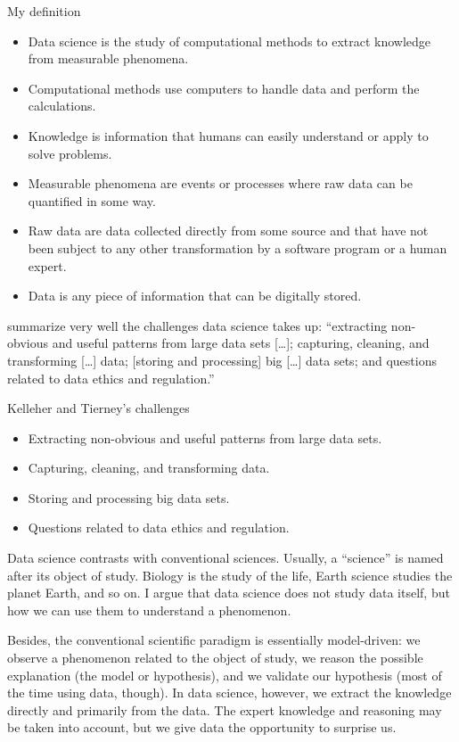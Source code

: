 \begin{slidebox}{My definition}{}
  \begin{itemize}
    \item Data science is the study of computational methods to extract knowledge from
      measurable phenomena.
    \item Computational methods use computers to handle data and perform the calculations.
    \item Knowledge is information that humans can easily understand or apply to solve
      problems.
    \item Measurable phenomena are events or processes where raw data can be quantified
      in some way.
    \item Raw data are data collected directly from some source and that have not been
      subject to any other transformation by a software program or a human expert.
    \item Data is any piece of information that can be digitally stored.
  \end{itemize}
\end{slidebox}

\textcite{Kelleher2018} summarize very well the challenges data science takes up:
``extracting non-obvious and useful patterns from large data sets [\dots]; capturing,
cleaning, and transforming [\dots] data; [storing and processing] big [\dots] data sets;
and questions related to data ethics and regulation.''

\begin{slidebox}{Kelleher and Tierney's challenges}{}
  \begin{itemize}
    \item Extracting non-obvious and useful patterns from large data sets.
    \item Capturing, cleaning, and transforming data.
    \item Storing and processing big data sets.
    \item Questions related to data ethics and regulation.
  \end{itemize}
\end{slidebox}

Data science contrasts with conventional sciences.  Usually, a ``science'' is named after
its object of study.  Biology is the study of the life, Earth science studies the planet
Earth, and so on.  I argue that data science does not study data itself, but how we can
use them to understand a phenomenon.

Besides, the conventional scientific paradigm is
essentially model-driven: we observe a phenomenon related to the object of study, we
reason the possible explanation (the model or hypothesis), and we validate our hypothesis
(most of the time using data, though).  In data science, however, we extract the knowledge
directly and primarily from the data.  The expert knowledge and reasoning may be taken
into account, but we give data the opportunity to surprise us.

